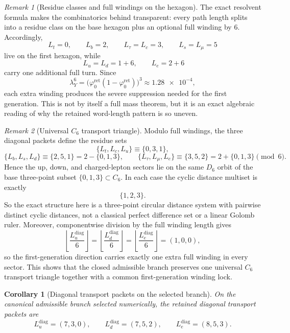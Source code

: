 \documentclass[11pt,a4paper]{article}
\newtheorem{corollary}[theorem]{Corollary}
\theoremstyle{definition}
\theoremstyle{remark}
\newtheorem*{remark}{Remark}
\newcommand{\phiz}{\varphi_0^{\mathrm{ret}}}
\begin{document}
\begin{remark}[Residue classes and full windings on the hexagon]
The exact resolvent formula  makes the combinatorics behind  transparent: every path length splits into a residue class on the base hexagon plus an optional full winding by $6$. Accordingly,
\[
L_t=0,\qquad
L_b=2,\qquad
L_\tau=L_c=3,\qquad
L_s=L_\mu=5
\]
live on the first hexagon, while
\[
\;L_u=L_d=1+6,
\qquad
L_e=2+6
\]
carry one additional full turn. Since
\[
\lambda_Y^6=\bigl(\phiz(1-\phiz)\bigr)^3\approx \num{1.28e-4},
\]
each extra winding produces the severe suppression needed for the first generation. This is not by itself a full mass theorem, but it is an exact algebraic reading of why the retained word-length pattern is so uneven.
\end{remark}

\begin{remark}[Universal $C_6$ transport triangle]
Modulo full windings, the three diagonal packets define the residue sets
\[
\{L_t,L_c,L_u\}\equiv\{0,3,1\},
\]
\[
\{L_b,L_s,L_d\}\equiv\{2,5,1\}=2-\{0,1,3\},
\qquad
\{L_\tau,L_\mu,L_e\}\equiv\{3,5,2\}=2+\{0,1,3\}
\pmod 6.
\]
Hence the up, down, and charged-lepton sectors lie on the same $D_6$ orbit of the base three-point subset $\{0,1,3\}\subset C_6$. In each case the cyclic distance multiset is exactly
\[
\{1,2,3\}.
\]
So the exact structure here is a three-point circular distance system with pairwise distinct cyclic distances, not a classical perfect difference set or a linear Golomb ruler.
Moreover, componentwise division by the full winding length gives
\[
\left\lfloor\frac{L_u^{\mathrm{diag}}}{6}\right\rfloor
=
\left\lfloor\frac{L_d^{\mathrm{diag}}}{6}\right\rfloor
=
\left\lfloor\frac{L_e^{\mathrm{diag}}}{6}\right\rfloor
=(1,0,0),
\]
so the first-generation direction carries exactly one extra full winding in every sector. This
shows that the closed admissible branch preserves one universal $C_6$ transport triangle together
with a common first-generation winding lock.
\end{remark}

\begin{corollary}[Diagonal transport packets on the selected branch]
\label{prin:minimal-admissible-transport-packets}
On the canonical admissible branch selected numerically, the retained diagonal transport packets
are
\[
L_u^{\mathrm{diag}}=(7,3,0),
\qquad
L_d^{\mathrm{diag}}=(7,5,2),
\qquad
L_e^{\mathrm{diag}}=(8,5,3).
\]
\end{corollary}
\end{document}
